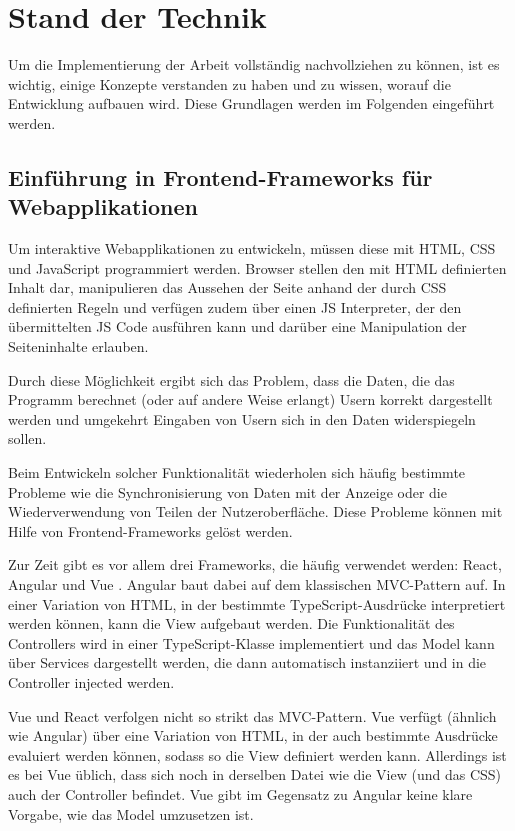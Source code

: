 \section{Stand der Technik}
Um die Implementierung der Arbeit vollständig nachvollziehen zu können, ist es wichtig, einige Konzepte verstanden zu haben und zu wissen, worauf die Entwicklung aufbauen wird. Diese Grundlagen werden im Folgenden eingeführt werden.

\subsection{Einführung in Frontend-Frameworks für Webapplikationen}
Um interaktive Webapplikationen zu entwickeln, müssen diese mit HTML, CSS und JavaScript programmiert werden. Browser stellen den mit HTML definierten Inhalt dar, manipulieren das Aussehen der Seite anhand der durch CSS definierten Regeln und verfügen zudem über einen \gls{JS} Interpreter, der den übermittelten \gls{JS} Code ausführen kann und darüber eine Manipulation der Seiteninhalte erlauben.

Durch diese Möglichkeit ergibt sich das Problem, dass die Daten, die das Programm berechnet (oder auf andere Weise erlangt) Usern korrekt dargestellt werden und umgekehrt Eingaben von Usern sich in den Daten widerspiegeln sollen.

Beim Entwickeln solcher Funktionalität wiederholen sich häufig bestimmte Probleme wie die Synchronisierung von Daten mit der Anzeige oder die Wiederverwendung von Teilen der Nutzeroberfläche. Diese Probleme können mit Hilfe von Frontend-Frameworks gelöst werden.

Zur Zeit gibt es vor allem drei Frameworks, die häufig verwendet werden: React, Angular und Vue \cite{stateofjs}. Angular baut dabei auf dem klassischen \gls{MVC}-Pattern auf. In einer Variation von HTML, in der bestimmte TypeScript-Ausdrücke interpretiert werden können, kann die View aufgebaut werden. Die Funktionalität des Controllers wird in einer TypeScript-Klasse implementiert und das Model kann über Services dargestellt werden, die dann automatisch instanziiert und in die Controller injected werden. \missingQuote

Vue und React verfolgen nicht so strikt das \gls{MVC}-Pattern. Vue verfügt (ähnlich wie Angular) über eine Variation von HTML, in der auch bestimmte Ausdrücke evaluiert werden können, sodass so die View definiert werden kann. Allerdings ist es bei Vue üblich, dass sich noch in derselben Datei wie die View (und das CSS) auch der Controller befindet. Vue gibt im Gegensatz zu Angular keine klare Vorgabe, wie das Model umzusetzen ist.

